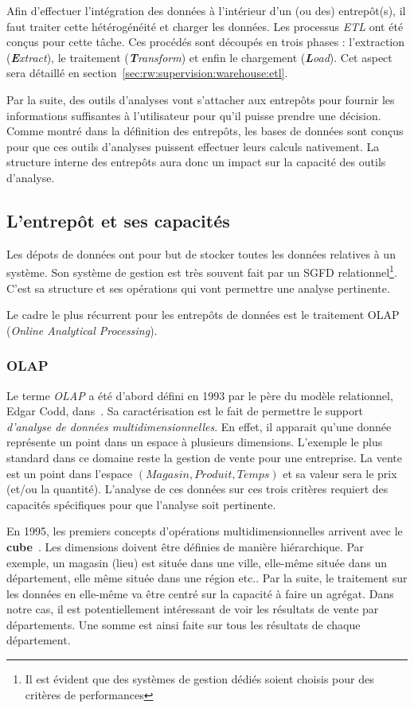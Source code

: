 Afin d'effectuer l'intégration des données à l'intérieur d'un (ou des) entrepôt(s), il faut traiter cette hétérogénéité et charger les données. Les processus \textit{ETL} ont été conçus pour cette tâche. Ces procédés sont découpés en trois phases : l'extraction (\textit{\textbf{E}xtract}), le traitement (\textit{\textbf{T}ransform}) et enfin le chargement (\textit{\textbf{L}oad}). Cet aspect sera détaillé en section~\ref{sec:rw:supervision:warehouse:etl}.

Par la suite, des outils d'analyses vont s'attacher aux entrepôts pour fournir les informations suffisantes à l'utilisateur pour qu'il puisse prendre une décision. Comme montré dans la définition des entrepôts, les bases de données sont conçus pour que ces outils d'analyses puissent effectuer leurs calculs nativement. La structure interne des entrepôts aura donc un impact sur la capacité des outils d'analyse.

\subsection{L'entrepôt et ses capacités}\label{sec:rw:supervision:warehouse:warehouse}
Les dépots de données ont pour but de stocker toutes les données relatives à un système. Son système de gestion est très souvent fait par un SGFD relationnel\footnote{Il est évident que des systèmes de gestion dédiés soient choisis pour des critères de performances}. C'est sa structure et ses opérations qui vont permettre une analyse pertinente.

Le cadre le plus récurrent pour les entrepôts de données est le traitement OLAP (\textit{Online Analytical Processing}). 
\subsubsection{OLAP}
Le terme \textit{OLAP} a été d'abord défini en 1993 par le père du modèle relationnel, Edgar Codd, dans~\cite{Codd:olap}. Sa caractérisation est le fait de permettre le support \textit{d'analyse de données multidimensionnelles}. En effet, il apparait qu'une donnée représente un point dans un espace à plusieurs dimensions. L'exemple le plus standard dans ce domaine reste la gestion de vente pour une entreprise. La vente est un point dans l'espace $(Magasin, Produit, Temps)$ et sa valeur sera le prix (et/ou la quantité). L'analyse de ces données sur ces trois critères requiert des capacités spécifiques pour que l'analyse soit pertinente.

En 1995, les premiers concepts d'opérations multidimensionnelles arrivent avec le \textbf{cube}~\cite{Gray:cube}. Les dimensions doivent être définies de manière hiérarchique. Par exemple, un magasin (lieu) est située dans une ville, elle-même située dans un département, elle même située dans une région etc.. Par la suite, le traitement sur les données en elle-même va être centré sur la capacité à faire un agrégat. Dans notre cas, il est potentiellement intéressant de voir les résultats de vente par départements. Une somme est ainsi faite sur tous les résultats de chaque département.

